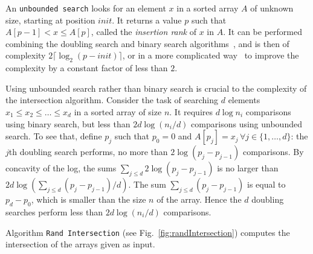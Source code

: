 An {\tt unbounded search} looks for an element $x$ in a sorted array
$A$ of unknown size, starting at position $init$.
%
It returns a value $p$ such that $A[p-1]{<}x{\leq}A[p]$, called the
{\em insertion rank} of $x$ in $A$.
%
It can be performed combining the doubling search and binary search
algorithms~\cite{adaptiveIntersectionAndTThresholdProblems,dlm,dlmAlenex},
and is then of complexity $2\lceil\log_2(p{-}init)\rceil$, or in a
more complicated
way~\cite{anAlmostOptimalAlgorithmForUnboundedSearching} to improve
the complexity by a constant factor of less than $2$.


 
Using unbounded search rather than binary search is crucial to the
complexity of the intersection algorithm.
%
Consider the task of searching $d$ elements $x_1\leq x_2 \leq \ldots
\leq x_d$ in a sorted array of size $n$.
%
It requires $d\log n_i$ comparisons using binary search, but less than
$2d\log(n_i/d)$ comparisons using unbounded search.
%
To see that, define $p_j$ such that $p_0=0$ and $A[p_j]=x_j\,\forall
j\in\{1,\ldots,d\}$: the $j$th doubling search performs, no more than
$2\log(p_j-p_{j-1})$ comparisons.
%
By concavity of the log, the sums
$\sum_{j\leq d}2\log(p_j-p_{j-1})$ is no larger than
$2d\log(\sum_{j\leq d}(p_j-p_{j-1})/d)$.
%
The sum $\sum_{j\leq d}(p_j-p_{j-1})$ is equal to $p_d-p_0$, which is
smaller than the size $n$ of the array.
%
Hence the $d$ doubling searches perform less than $2d\log(n_i/d)$
comparisons.




\begin{theorem}\label{th:correctnessAlgorithm}
Algorithm {\tt Rand Intersection}
(see Fig.~\ref{fig:randIntersection}) computes the intersection of
the arrays given as input.
\end{theorem}

%
\def\R{\hbox{\tt Result}}

